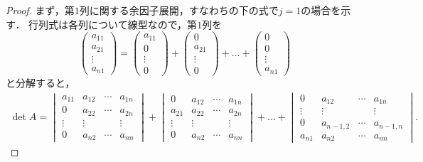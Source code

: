 \begin{tleftbar}
\begin{proof}
まず，第$1$列に関する余因子展開，すなわちの下の式で$j=1$の場合を示す．
行列式は各列について線型なので，第$1$列を
\[
\begin{pmatrix} a_{11} \\ a_{21} \\ \vdots \\ a_{n1} \end{pmatrix}
= \begin{pmatrix} a_{11} \\ 0 \\ \vdots \\ 0 \end{pmatrix}
+ \begin{pmatrix} 0 \\ a_{21} \\ \vdots \\ 0 \end{pmatrix}
+ \dots
+ \begin{pmatrix} 0 \\ 0 \\ \vdots \\ a_{n1} \end{pmatrix}
\]
と分解すると，
\begin{align*}
  \det A =
  \begin{vmatrix}
    a_{11} & a_{12} & \cdots & a_{1n} \\
    0      & a_{22} & \cdots & a_{2n} \\
    \vdots & \vdots &        & \vdots \\
    0      & a_{n2} & \cdots & a_{nn}
  \end{vmatrix}
  +
  \begin{vmatrix}
    0      & a_{12} & \cdots & a_{1n} \\
    a_{21} & a_{22} & \cdots & a_{2n} \\
    \vdots & \vdots &        & \vdots \\
    0      & a_{n2} & \cdots & a_{nn}
  \end{vmatrix}
  + \dots +
  \begin{vmatrix}
    0      & a_{12}     & \cdots & a_{1n} \\
    \vdots & \vdots     &        & \vdots \\
    0      & a_{n-1,2}  & \cdots & a_{n-1,n} \\
    a_{n1} & a_{n2}     & \cdots & a_{nn}
  \end{vmatrix}.

\end{align*}
\end{proof}
\end{tleftbar}

